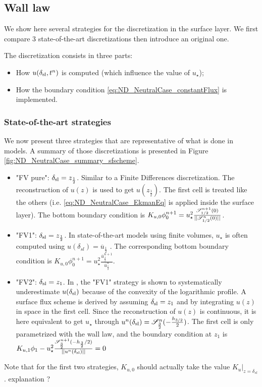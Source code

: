 \subsection{Wall law}
We show here several strategies for the discretization
in the surface layer. We first compare 3 state-of-the-art
discretizations then introduce an original one.

The discretization consists in three parts:
\begin{itemize}
	\item How $u(\delta_{\rm sl}, t^n)$ is computed
		(which influence the value of $u_\star$);
	\item How the boundary condition 
		\eqref{eq:ND_NeutralCase_constantFlux} is implemented.
\end{itemize}
\subsubsection{State-of-the-art strategies}
  We now present three strategies that are representative of
  what is done in models. A summary of those discretizations
  is presented in Figure \ref{fig:ND_NeutralCase_summary_sfscheme}.
  \begin{itemize}
	  \item "FV pure": $\delta_{\rm sl} = z_{\frac{1}{2}}$. Similar to a Finite Differences discretization.
	    The reconstruction of $u(z)$ is used to get 
		  $u(z_{\frac{1}{2}})$.
		  The first cell is treated like the others
		  (i.e. \eqref{eq:ND_NeutralCase_EkmanEq} is
		  applied inside the surface layer).
	The bottom boundary condition is 
		  $ K_{u,0} \phi_0^{n+1} = u_\star^2 
		  \frac{{\cal S}_{1/2}^{n+1}(0)}{||{\cal S}_{1/2}^n(0)||}$.
	  \item "FV1": $\delta_{\rm sl} = z_{\frac{1}{2}}$.
		  In state-of-the-art models using finite volumes,
		  $u_{\star}$ is often computed using
		  $u(\delta_{sl}) = \overline{u}_{\frac{1}{2}}$
		\cite{nishizawa2018surface}.
		The corresponding bottom boundary condition is
		$ K_{u,0} \phi_0^{n+1} = u_\star^2 
		  \frac{\overline{u}^{n+1}_{\frac{1}{2}}}
		  	{\overline{u}_{\frac{1}{2}}^n}$.

    \item "FV2":  $\delta_{\rm sl} = z_{1}$. In
    \cite{nishizawa2018surface}, the "FV1" strategy is shown to systematically
	  underestimate $u(\delta_{\rm sl})$ because of the 
	  convexity of the logarithmic profile.
	A surface flux scheme is derived by assuming
	  $\delta_{\rm sl} = z_1$ and by integrating $u(z)$
	  in space in the first cell. Since the reconstruction
	  of $u(z)$ is continuous, it is here equivalent to
	  get $u_\star$ through
	  $u^n(\delta_{\rm sl}) = {\cal S}^n_{\frac{3}{2}}(
	  -\frac{h_{3/2}}{2})$. The first cell is only
	  parametrized with the wall law, and the boundary condition
		  at $z_1$ is $K_{u,1} \phi_1 - u_\star^2 
		  \frac{{\cal S}_{\frac{3}{2}}^{n+1}
		  	(-h_{\frac{3}{2}}/2)}
		  {||u^n(\delta_{\rm sl})||} = 0$
	  
  \end{itemize}
  Note that for the first two strategies, $K_{u,0}$ should actually
  take the value $\left. K_{u}\right|_{z=\delta_{sl}}$.
  {\color{red} explanation ?}

